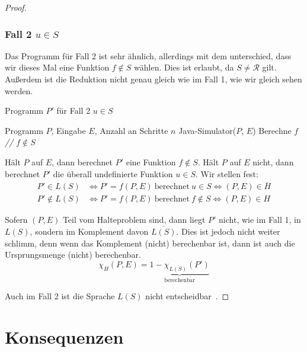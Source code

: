 \documentclass[journal]{IEEEtran}
\begin{document}
\begin{proof}
\subsubsection{Fall 2 $u \in S$}

Das Programm für Fall 2 ist sehr ähnlich, allerdings mit dem unterschied, dass wir dieses Mal eine Funktion $f \notin S$ wählen. Dies ist erlaubt, da $S \ne \mathcal{R}$ gilt. Außerdem ist die Reduktion nicht genau gleich wie im Fall 1, wie wir gleich sehen werden.

\begin{algorithm}
\caption{Programm $P'$ für Fall 2 $u \in S$}
\begin{algorithmic}[1]
\renewcommand{\algorithmicrequire}{\textbf{Input:}}
\renewcommand{\algorithmicensure}{\textbf{Output:}}
\REQUIRE Programm $P$, Eingabe $E$, Anzahl an Schritte $n$
\STATE Java-Simulator($P$, $E$)
\STATE Berechne $f$ \textit{// $f \notin S$}
\end{algorithmic}
\end{algorithm}

Hält $P$ auf $E$, dann berechnet $P'$ eine Funktion $f \notin S$. Hält $P$ auf $E$ nicht, dann berechnet $P'$ die überall undefinierte Funktion $u \in S$. Wir stellen fest:
\begin{align*}
P' \in L(S) &\Leftrightarrow P' = f(P, E) \ \text{berechnet} \ u \in S \Leftrightarrow (P, E) \in \overline{H} \\
P' \notin L(S) &\Leftrightarrow P' = f(P, E) \ \text{berechnet} \ f \notin S \Leftrightarrow (P, E) \in H
\end{align*}

Sofern $(P, E)$ Teil vom Halteproblem sind, dann liegt $P'$ nicht, wie im Fall 1, in $L(S)$, sondern im Komplement davon $\overline{L(S)}$. Dies ist jedoch nicht weiter schlimm, denn wenn das Komplement (nicht) berechenbar ist, dann ist auch die Ursprungsmenge (nicht) berechenbar.
\begin{equation*}
\chi_{H}(P, E) = \underbrace{1 - \chi_{L(S)}(P')}_{\text{berechenbar}}
\end{equation*}

Auch im Fall 2 ist die Sprache $L(S)$ nicht entscheidbar~\cite{satzvonricebeweis}.

\end{proof}

\section{Konsequenzen}
\label{konsequenzen}
\end{document}
